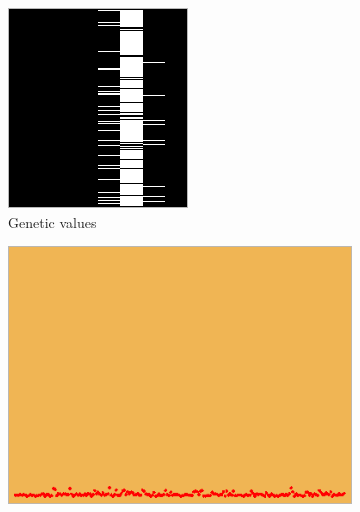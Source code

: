 \documentclass[a4paper,12pt]{article}
\begin{document}
 \begin{figure}[h]
    \centering
    \begin{subfigure}[b]{0.3\linewidth} 
        \includegraphics[width=\linewidth, height =\linewidth]{Exo_Genome}
        \caption{Genetic values}
    \end{subfigure}
    \begin{subfigure}[b]{0.3\linewidth}
        \includegraphics[width=\linewidth, height = \linewidth]{Exo_Field}

\end{subfigure}
\end{figure}
\end{document}
